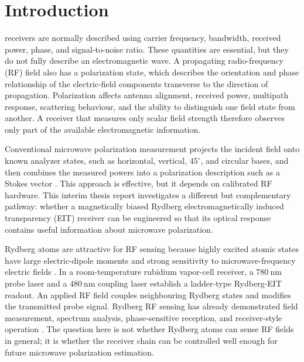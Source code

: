 \documentclass{ieeeaccess}
\begin{document}
\section{Introduction}
\label{sec:introduction}

 receivers are normally described using carrier frequency, bandwidth, received power, phase, and signal-to-noise ratio. These quantities are essential, but they do not fully describe an electromagnetic wave. A propagating radio-frequency (RF) field also has a polarization state, which describes the orientation and phase relationship of the electric-field components transverse to the direction of propagation. Polarization affects antenna alignment, received power, multipath response, scattering behaviour, and the ability to distinguish one field state from another. A receiver that measures only scalar field strength therefore observes only part of the available electromagnetic information.

Conventional microwave polarization measurement projects the incident field onto known analyzer states, such as horizontal, vertical, \(45^\circ\), and circular bases, and then combines the measured powers into a polarization description such as a Stokes vector \cite{Balanis2016,Collett2005}. This approach is effective, but it depends on calibrated RF hardware. This interim thesis report investigates a different but complementary pathway: whether a magnetically biased Rydberg electromagnetically induced transparency (EIT) receiver can be engineered so that its optical response contains useful information about microwave polarization.

Rydberg atoms are attractive for RF sensing because highly excited atomic states have large electric-dipole moments and strong sensitivity to microwave-frequency electric fields \cite{Gallagher2005,Holloway2014,Schlossberger2024Review}. In a room-temperature rubidium vapor-cell receiver, a \(780~\mathrm{nm}\) probe laser and a \(480~\mathrm{nm}\) coupling laser establish a ladder-type Rydberg-EIT readout. An applied RF field couples neighbouring Rydberg states and modifies the transmitted probe signal. Rydberg RF sensing has already demonstrated field measurement, spectrum analysis, phase-sensitive reception, and receiver-style operation \cite{Sedlacek2012,Simons2019Mixer,Meyer2021Spectrum,ArtusioGlimpse2022}. The question here is not whether Rydberg atoms can sense RF fields in general; it is whether the receiver chain can be controlled well enough for future microwave polarization estimation.
\end{document}

